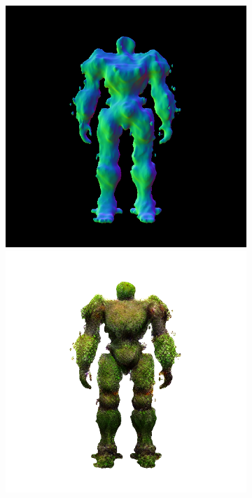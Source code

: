 \begin{figure}[ht]
\begin{subfigure}[b]{0.222\textwidth}
        \includegraphics[width=\textwidth]{figures/appendix/magic123_refine_robot_back_5000_part2.png}
        \includegraphics[width=\textwidth]{figures/appendix/magic123_refine_robot_back_5000_part1.png}

\end{subfigure}
\end{figure}

